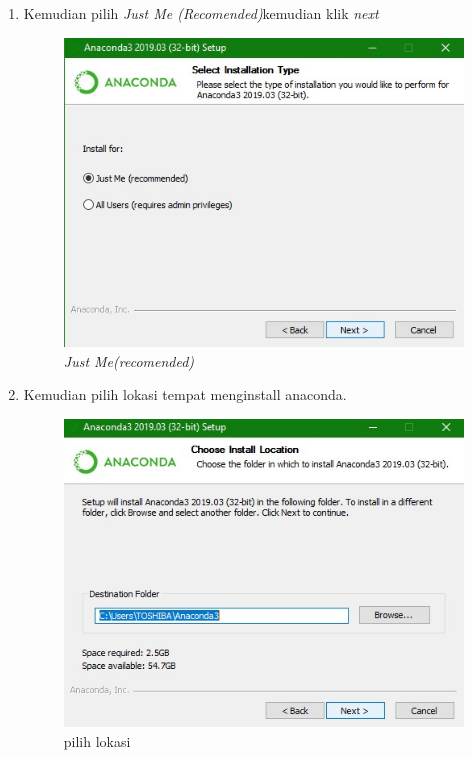 \begin{enumerate}
\item Kemudian pilih \textit{Just Me (Recomended)}kemudian klik \textit{next}
\begin{figure}[H]
        \centerline{\includegraphics[scale=0.5]{figures/d}}
        \caption{\textit{Just Me(recomended)}}
		\label{langkah2}
\end{figure}


\item Kemudian pilih lokasi tempat menginstall anaconda.

\begin{figure}[H]
    \centering
    \includegraphics[scale=0.5]{figures/e}
    \caption{pilih lokasi}
    \label{Figureanaconda3}
\end{figure}



\end{enumerate}
